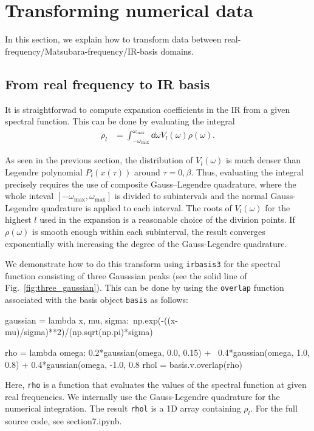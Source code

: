 \documentclass[submission, LectureNotes]{SciPost}
\newcommand{\wmax}{\ensuremath{{\omega_\mathrm{max}}}}
\begin{document}
\clearpage
\section{Transforming numerical data}
In this section,
we explain how to transform data between real-frequency/Matsubara-frequency/IR-basis domains.

\subsection{From real frequency to IR basis}
It is straightforwad to compute expansion coefficients in the IR 
from a given spectral function.
This can be done by evaluating the integral
\begin{align}
    \rho_l &= \int_{-\wmax}^\wmax \dd \omega V_l(\omega) \rho(\omega).
\end{align}

As seen in the previous section,
the distribution of $V_l(\omega)$ is much denser than Legendre polynomial $P_l(x(\tau))$ around $\tau=0, \beta$.
Thus, evaluating the integral precisely requires the use of composite Gauss–Legendre quadrature,
where the whole inteval $[-\wmax, \wmax]$ is divided to subintervals and the normal Gauss-Legendre quadrature is 
applied to each interval.
The roots of $V_l(\omega)$ for the highest $l$ used in the expansion
is a reasonable choice of the division points.
If $\rho(\omega)$ is smooth enough within each subinterval,
the result converges exponentially with increasing the degree of the Gauss-Legendre quadrature.

We demonstrate how to do this transform using \texttt{irbasis3} for the spectral function consisting 
of three Gausssian peaks (see the solid line of Fig.~\ref{fig:three_gaussian}).
This can be done by using the \texttt{overlap} function associated with the basis object \texttt{basis}
as follows:
\begin{python}
gaussian = lambda x, mu, sigma:\
    np.exp(-((x-mu)/sigma)**2)/(np.sqrt(np.pi)*sigma)

rho = lambda omega: 0.2*gaussian(omega, 0.0, 0.15) + \
    0.4*gaussian(omega, 1.0, 0.8) + 0.4*gaussian(omega, -1.0, 0.8
rhol = basis.v.overlap(rho)
\end{python}
Here, \texttt{rho} is a function that evaluates the values of the spectral function at given real frequencies.
We internally use the Gauss-Legendre quadrature for the numerical integration.
The result \texttt{rhol} is a 1D array containing $\rho_l$.
For the full source code, see section7.ipynb.
\end{document}
